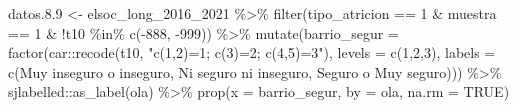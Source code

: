 \documentclass[
  12pt,
]{book}
\newenvironment{Shaded}{\begin{snugshade}}{\end{snugshade}}
\newcommand{\AttributeTok}[1]{\textcolor[rgb]{0.77,0.63,0.00}{#1}}
\newcommand{\ConstantTok}[1]{\textcolor[rgb]{0.00,0.00,0.00}{#1}}
\newcommand{\DecValTok}[1]{\textcolor[rgb]{0.00,0.00,0.81}{#1}}
\newcommand{\FloatTok}[1]{\textcolor[rgb]{0.00,0.00,0.81}{#1}}
\newcommand{\FunctionTok}[1]{\textcolor[rgb]{0.00,0.00,0.00}{#1}}
\newcommand{\NormalTok}[1]{#1}
\newcommand{\OtherTok}[1]{\textcolor[rgb]{0.56,0.35,0.01}{#1}}
\newcommand{\SpecialCharTok}[1]{\textcolor[rgb]{0.00,0.00,0.00}{#1}}
\newcommand{\StringTok}[1]{\textcolor[rgb]{0.31,0.60,0.02}{#1}}
\begin{document}
\begin{Shaded}
\begin{Highlighting}[]
\NormalTok{datos.}\FloatTok{8.9} \OtherTok{\textless{}{-}}\NormalTok{ elsoc\_long\_2016\_2021 }\SpecialCharTok{\%\textgreater{}\%} 
  \FunctionTok{filter}\NormalTok{(tipo\_atricion }\SpecialCharTok{==} \DecValTok{1} \SpecialCharTok{\&}\NormalTok{ muestra }\SpecialCharTok{==} \DecValTok{1} \SpecialCharTok{\&} \SpecialCharTok{!}\NormalTok{t10 }\SpecialCharTok{\%in\%} \FunctionTok{c}\NormalTok{(}\SpecialCharTok{{-}}\DecValTok{888}\NormalTok{, }\SpecialCharTok{{-}}\DecValTok{999}\NormalTok{)) }\SpecialCharTok{\%\textgreater{}\%} 
  \FunctionTok{mutate}\NormalTok{(}\AttributeTok{barrio\_segur =} \FunctionTok{factor}\NormalTok{(car}\SpecialCharTok{::}\FunctionTok{recode}\NormalTok{(t10, }\StringTok{"c(1,2)=1; c(3)=2; c(4,5)=3"}\NormalTok{), }\AttributeTok{levels =} \FunctionTok{c}\NormalTok{(}\DecValTok{1}\NormalTok{,}\DecValTok{2}\NormalTok{,}\DecValTok{3}\NormalTok{),}
                               \AttributeTok{labels =} \FunctionTok{c}\NormalTok{(}\StringTok{\textquotesingle{}Muy inseguro o inseguro\textquotesingle{}}\NormalTok{, }\StringTok{\textquotesingle{}Ni seguro ni inseguro\textquotesingle{}}\NormalTok{,}
                                          \StringTok{\textquotesingle{}Seguro o Muy seguro\textquotesingle{}}\NormalTok{))) }\SpecialCharTok{\%\textgreater{}\%}
\NormalTok{  sjlabelled}\SpecialCharTok{::}\FunctionTok{as\_label}\NormalTok{(ola) }\SpecialCharTok{\%\textgreater{}\%}
  \FunctionTok{prop}\NormalTok{(}\AttributeTok{x =}\NormalTok{ barrio\_segur, }\AttributeTok{by =}\NormalTok{ ola, }\AttributeTok{na.rm =} \ConstantTok{TRUE}\NormalTok{)}


\end{Highlighting}
\end{Shaded}
\end{document}
